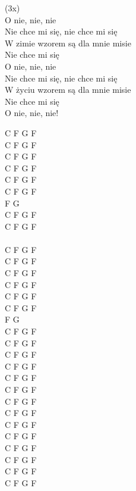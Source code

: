 \begin{text}
\vin (3x)\\
\vin O nie, nie, nie\\
\vin Nie chce mi się, nie chce mi się\\
\vin W zimie wzorem są dla mnie misie\\
\vin Nie chce mi się\\

\vin O nie, nie, nie\\
\vin Nie chce mi się, nie chce mi się\\
\vin W życiu wzorem są dla mnie misie\\
\vin Nie chce mi się\\

\vin O nie, nie, nie!\\
\end{text}
\begin{chord}
C F G F\\
C F G F\\
C F G F\\
C F G F\\

C F G F\\
C F G F\\
F G\\
C F G F\\
C F G F\\

\vin \\
C F G F\\
C F G F\\
C F G F\\
C F G F\\

C F G F\\
C F G F\\
F G\\
C F G F\\
C F G F\\

C F G F\\
C F G F\\
C F G F\\
C F G F\\

C F G F\\
C F G F\\
C F G F\\
C F G F\\

C F G F\\
C F G F\\
C F G F\\
C F G F\\


\end{chord}
